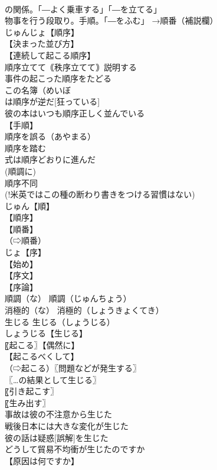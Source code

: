 \documentclass[8pt]{extreport}
\begin{document}
\begin{CJK}{UTF8}{min}
\\	の関係。「―よく乗車する」「―を立てる」
\\	物事を行う段取り。手順。「―をふむ」 →順番（補説欄）
\\	じゅんじょ【順序】
\\	【決まった並び方】
\\	【連続して起こる順序】
\\	順序立てて｟秩序立てて｠説明する
\\	事件の起こった順序をたどる
\\	この名簿（めいぼ 
\\	は順序が逆だ[狂っている]
\\	彼の本はいつも順序正しく並んでいる
\\	【手順】
\\	順序を誤る（あやまる）
\\	順序を踏む
\\	式は順序どおりに進んだ
\\	(順調に) 
\\	順序不同
\\	(!米英ではこの種の断わり書きをつける習慣はない)
\\	じゅん【順】
\\	【順序】
\\	【順番】
\\	（⇨順番）
\\	じょ【序】
\\	【始め】
\\	【序文】
\\	【序論】
\\	順調（な）		順調（じゅんちょう）
\\	消極的（な）		消極的（しょうきょくてき）
\\	生じる		生じる（しょうじる）
\\	しょうじる【生じる】
\\	〖起こる〗【偶然に】
\\	【起こるべくして】
\\	（⇨起こる）〖問題などが発生する〗
\\	〖…の結果として生じる〗
\\	〖引き起こす〗
\\	〖生み出す〗
\\	事故は彼の不注意から生じた
\\	戦後日本には大きな変化が生じた
\\	彼の話は疑惑[誤解]を生じた
\\	どうして貿易不均衝が生じたのですか
\\	【原因は何ですか】

\end{CJK}
\end{document}
